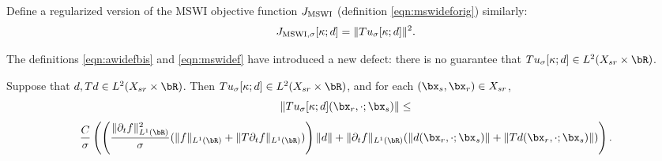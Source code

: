 Define a regularized version of the MSWI objective function $J_{\rm
  MSWI}$ (definition \ref{eqn:mswideforig}) similarly:
\begin{equation}
  \label{eqn:mswidef}
  J_{\rm MSWI,\sigma}[\kappa;d] = \|Tu_{\sigma}[\kappa;d]\|^2.
\end{equation}

The definitions \ref{eqn:awidefbis} and \ref{eqn:mswidef} have introduced a new defect: there is no
guarantee that $Tu_{\sigma}[\kappa;d] \in L^2(X_{sr} \times\bR)$.

\begin{prop}
  \label{thm:tl2}
  Suppose that $d, Td \in L^2(X_{sr} \times \bR)$. Then
  $Tu_{\sigma}[\kappa;d]  \in L^2(X_{sr} \times \bR)$, and for each
  $(\bx_s,\bx_r) \in X_{sr}$,
  \[
    \|Tu_{\sigma}[\kappa;d](\bx_r,\cdot;\bx_s)\| \le
  \]
  \begin{equation}
    \label{eqn:tunorm}
    \frac{C}{\sigma}\left(\left(
        \frac{\|\partial_t f\|^2_{L^1(\bR)}}{\sigma}(\|f\|_{L^1(\bR)}+\|T\partial_tf\|_{L^1(\bR)})
      \right)\|d\| \\ 
    + \|\partial_t  f\|_{L^1(\bR)}(\|d (\bx_r,\cdot;\bx_s)\| +\|Td (\bx_r,\cdot;\bx_s)\|)\right).
  \end{equation}
\end{prop}

